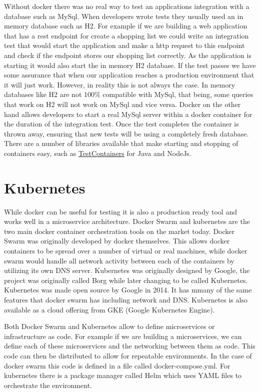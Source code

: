 Without docker there was no real way to test an applications integration with a database such as MySql. When developers wrote tests they usually used an in memory database such as H2. For example if we are building a web application that has a rest endpoint for create a shopping list we could write an integration test that would start the application and make a http request to this endpoint and check if the endpoint stores our shopping list correctly. As the application is starting it would also start the in memory H2 database. If the test passes we have some assurance that when our application reaches a production environment that it will just work. However, in reality this is not always the case. In memory databases like H2 are not 100\% compatible with MySql, that being, some queries that work on H2 will not work on MySql and vice versa. Docker on the other hand allows developers to start a real MySql server within a docker container for the duration of the integration test. Once the test completes the container is thrown away, ensuring that new tests will be using a completely fresh database. There are a number of libraries available that make starting and stopping of containers easy, such as \href{https://www.testcontainers.org/}{TestContainers} for Java and NodeJs.

\section{Kubernetes}

While docker can be useful for testing it is also a production ready tool and works well in a microservice architecture. Docker Swarm and kubernetes are the two main docker container orchestration tools on the market today. Docker Swarm was originally developed by docker themselves. This allows docker containers to be spread over a number of virtual or real machines, while docker swarm would handle all network activity between each of the containers by utilizing its own DNS server. Kubernetes was originally designed by Google, the project was originally called Borg while later changing to be called Kubernetes. Kubernetes was made open source by Google in 2014. It has mmany of the same features that docker swarm has including network and DNS. Kubernetes is also available as a cloud offering from GKE (Google Kubernetes Engine). 

Both Docker Swarm and Kubernetes allow to define microservices or infrastructure as code. For example if we are building a microservices, we can define each of these microservices and the networking between them as code. This code can then be distributed to allow for repeatable environments. In the case of docker swarm this code is defined in a file called docker-compose.yml. For kubernetes there is a package manager called Helm which uses YAML files to orchestrate the environment.

